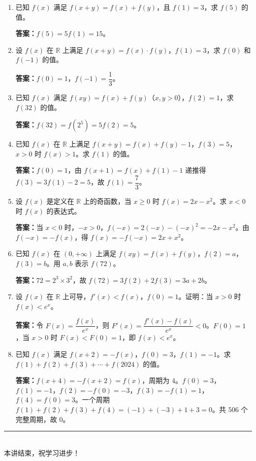 \documentclass[12pt,a4paper]{ctexart}
\begin{document}
\begin{enumerate}[label=\textbf{题\arabic*.},leftmargin=2em]

\item 已知 $f(x)$ 满足 $f(x+y)=f(x)+f(y)$，且 $f(1)=3$，求 $f(5)$ 的值。

\medskip
\textbf{答案：}$f(5)=5f(1)=15$。

\bigskip

\item 设 $f(x)$ 在 $\mathbb{R}$ 上满足 $f(x+y)=f(x)\cdot f(y)$，$f(1)=3$，求 $f(0)$ 和 $f(-1)$ 的值。

\medskip
\textbf{答案：}$f(0)=1$，$f(-1)=\dfrac{1}{3}$。

\bigskip

\item 已知 $f(x)$ 满足 $f(xy)=f(x)+f(y)$（$x,y>0$），$f(2)=1$，求 $f(32)$ 的值。

\medskip
\textbf{答案：}$f(32)=f(2^5)=5f(2)=5$。

\bigskip

\item 已知 $f(x)$ 在 $\mathbb{R}$ 上满足 $f(x+y)=f(x)+f(y)-1$，$f(3)=5$，$x>0$ 时 $f(x)>1$。求 $f(1)$ 的值。

\medskip
\textbf{答案：}$f(0)=1$，由 $f(x+1)=f(x)+f(1)-1$ 递推得 $f(3)=3f(1)-2=5$，故 $f(1)=\dfrac{7}{3}$。

\bigskip

\item 设 $f(x)$ 是定义在 $\mathbb{R}$ 上的奇函数，当 $x\ge0$ 时 $f(x)=2x-x^2$。求 $x<0$ 时 $f(x)$ 的表达式。

\medskip
\textbf{答案：}当 $x<0$ 时，$-x>0$，$f(-x)=2(-x)-(-x)^2=-2x-x^2$。由 $f(-x)=-f(x)$，得 $f(x)=-f(-x)=2x+x^2$。

\bigskip

\item 已知 $f(x)$ 在 $(0,+\infty)$ 上满足 $f(xy)=f(x)+f(y)$，$f(2)=a$，$f(3)=b$。用 $a,b$ 表示 $f(72)$。

\medskip
\textbf{答案：}$72=2^3\times3^2$，故 $f(72)=3f(2)+2f(3)=3a+2b$。

\bigskip

\item 设 $f(x)$ 在 $\mathbb{R}$ 上可导，$f'(x)<f(x)$，$f(0)=1$。证明：当 $x>0$ 时 $f(x)<e^x$。

\medskip
\textbf{答案：}令 $F(x)=\dfrac{f(x)}{e^x}$，则 $F'(x)=\dfrac{f'(x)-f(x)}{e^x}<0$。$F(0)=1$，当 $x>0$ 时 $F(x)<F(0)=1$，即 $f(x)<e^x$。

\bigskip

\item 已知 $f(x)$ 满足 $f(x+2)=-f(x)$，$f(0)=3$，$f(1)=-1$。求 $f(1)+f(2)+f(3)+\cdots+f(2024)$ 的值。

\medskip
\textbf{答案：}$f(x+4)=-f(x+2)=f(x)$，周期为 $4$。$f(0)=3$，$f(1)=-1$，$f(2)=-f(0)=-3$，$f(3)=-f(1)=1$，$f(4)=f(0)=3$。一个周期 $f(1)+f(2)+f(3)+f(4)=(-1)+(-3)+1+3=0$。共 $506$ 个完整周期，故 $\boxed{0}$。

\end{enumerate}

\vfill
\begin{center}
\textcolor{mainblue}{\rule{0.6\textwidth}{0.5pt}}\\[4pt]
{\small 本讲结束，祝学习进步！}
\end{center}
\end{document}
